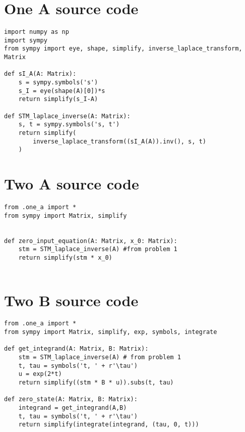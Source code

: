 \appendix

\vspace{2cm}
\section{One A source code} \label{appendix:one-a-src}
\begin{verbatim}
import numpy as np
import sympy
from sympy import eye, shape, simplify, inverse_laplace_transform, Matrix

def sI_A(A: Matrix):
    s = sympy.symbols('s')
    s_I = eye(shape(A)[0])*s
    return simplify(s_I-A)

def STM_laplace_inverse(A: Matrix):
    s, t = sympy.symbols('s, t')
    return simplify(
        inverse_laplace_transform((sI_A(A)).inv(), s, t)
    )
\end{verbatim}

\section{Two A source code} \label{appendix:two-a-src}
\begin{verbatim}
from .one_a import *
from sympy import Matrix, simplify


def zero_input_equation(A: Matrix, x_0: Matrix):
    stm = STM_laplace_inverse(A) #from problem 1 
    return simplify(stm * x_0)


\end{verbatim}

\section{Two B source code} \label{appendix:two-b-src}
\begin{verbatim}
from .one_a import *
from sympy import Matrix, simplify, exp, symbols, integrate

def get_integrand(A: Matrix, B: Matrix):
    stm = STM_laplace_inverse(A) # from problem 1
    t, tau = symbols('t, ' + r'\tau')
    u = exp(2*t)
    return simplify((stm * B * u)).subs(t, tau)
    
def zero_state(A: Matrix, B: Matrix):
    integrand = get_integrand(A,B)
    t, tau = symbols('t, ' + r'\tau')
    return simplify(integrate(integrand, (tau, 0, t)))
\end{verbatim}

